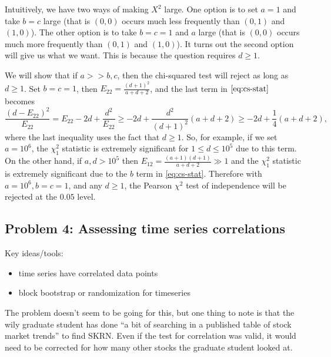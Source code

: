 Intuitively, we have two ways of making $X^2$ large. One option is to set $a=1$ and take $b=c$ large (that is $(0,0)$ occurs much less frequently than $(0,1)$ and $(1,0)$). The other option is to take $b=c=1$ and $a$ large (that is $(0,0)$ occurs much more frequently than $(0,1)$ and $(1,0)$). It turns out the second option will give us what we want. This is because the question requires $d \ge 1$. 

We will show that if $a >> b,c$, then the chi-squared test will reject as long as $d \ge 1$. Set $b=c=1$, then $E_{22} = \frac{(d+1)^2}{a+d+2}$, and the last term in $\eqref{eq:cs-stat}$ becomes
\begin{equation*}
\frac{(d-E_{22})^2}{E_{22}} = E_{22} - 2d + \frac{d^2}{E_{22}} \geq - 2d + \frac{d^2}{(d+1)^2} (a+d+2) \geq - 2d + \frac{1}{4}(a+d+2), 
\end{equation*}
where the last inequality uses the fact that $d \geq 1$. So, for example, if we set $a=10^6$, the $\chi_1^2$ statistic is extremely significant for $1\leq d\leq 10^5$ due to this term.  On the other hand, if $a,d>10^5$ then $E_{12}=\frac{(a+1)(d+1)}{a+d+2}\gg 1$ and the $\chi_1^2$ statistic is extremely significant due to the $b$ term in \eqref{eq:cs-stat}. Therefore with $a=10^6,b=c=1$, and any $d \geq 1$, the Pearson $\chi^2$ test of independence will be rejected at the $0.05$ level.

\subsection*{Problem 4: Assessing time series correlations}
Key ideas/tools:
\begin{itemize}
\item time series have correlated data points 
\item block bootstrap or randomization for timeseries
\end{itemize}

The problem doesn't seem to be going for this, but one thing to note is that the wily graduate student has done ``a bit of searching in a published table of stock market trends'' to find SKRN. Even if the test for correlation was valid, it would need to be corrected for how many other stocks the graduate student looked at.


